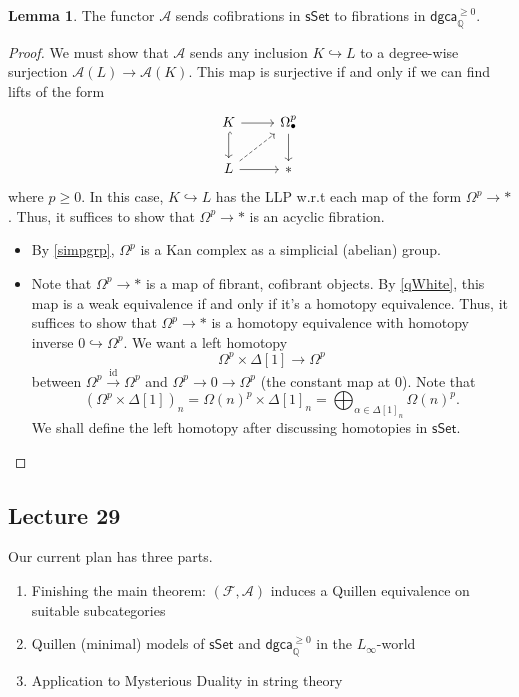 \documentclass[10pt,letterpaper,cm]{nupset}
\theoremstyle{definition}
\theoremstyle{theorem}
\newtheorem{lemma}[defn]{Lemma}
\theoremstyle{remark}
\newcommand{\A}{\mathcal A}
\newcommand{\F}{\mathcal F}
\newcommand{\Q}{\mathbb Q}
\newcommand{\1}{\mathbb{1}}
\newcommand{\dgca}{\mathsf{dgca}}
\newcommand{\0}{\vec 0}
\DeclareMathOperator{\id}{id}
\newcommand{\bi}{\begin{itemize}}
\newcommand{\ei}{\end{itemize}}
\newcommand{\be}{\begin{enumerate}}
\newcommand{\ee}{\end{enumerate}}
\begin{document}
\begin{lemma} \label{pres1}
The functor $\A$ sends cofibrations in $\mathsf{sSet}$ to fibrations in $\dgca_{\Q}^{\geq 0}$.
\end{lemma}
\begin{proof}
We must show that $\A$ sends any inclusion $K \hookrightarrow L$ to a degree-wise surjection $\A(L) \to \A(K)$. This map is surjective if and only if we can find lifts of the form
\[
\begin{tikzcd}
	K & {\Omega_{\bullet}^p} \\
	L & \ast
	\arrow[from=1-2, to=2-2]
	\arrow[from=2-1, to=2-2]
	\arrow[dashed, from=2-1, to=1-2]
	\arrow[hook, from=1-1, to=2-1]
	\arrow[from=1-1, to=1-2]
\end{tikzcd}
\] where $p \geq 0$. In this case, $K \hookrightarrow L$ has the LLP w.r.t each map of the form $\Omega^p \to \ast$. Thus, it suffices to show that $\Omega^p \to \ast$ is an acyclic fibration.
\bi
\item  By \cref{simpgrp}, $\Omega^p$ is a Kan complex as a simplicial (abelian) group.
\item Note that  $\Omega^p \to \ast$ is a map of fibrant, cofibrant objects. By \cref{qWhite}, this map is a weak equivalence if and only if it's a homotopy equivalence. Thus, it suffices to show that $\Omega^p \to \ast$ is a homotopy equivalence with homotopy inverse $0 \hookrightarrow \Omega^p$. We want a left homotopy 
\[
\Omega^p \times \Delta\left[1\right] \to \Omega^p
\] between $\Omega^p \xrightarrow{\id} \Omega^p$ and $\Omega^p \to 0 \to \Omega^p$ (the constant map at $0$). Note that
\[
\left(\Omega^p \times \Delta\left[1\right]\right)_n = \Omega(n)^p \times \Delta\left[1\right]_n = \bigoplus_{\alpha \in \Delta\left[1\right]_n}\Omega(n)^p
.\] We shall define the left homotopy after discussing homotopies in $\mathsf{sSet}$.
\ei
\end{proof}

\subsection{Lecture 29}

Our current plan has three parts.
\be
\item Finishing the main theorem: $\left(\F, \A\right)$ induces a Quillen equivalence on suitable subcategories
\item Quillen (minimal) models of $\mathsf{sSet}$ and $\dgca_{\Q}^{\geq 0}$ in the $L_{\infty}$-world
\item Application to Mysterious Duality in string theory
\ee
\end{document}
